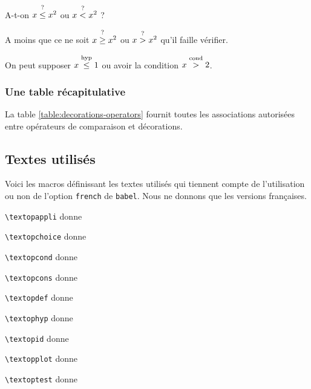\documentclass[12pt,a4paper]{article}
\begin{document}
\begin{tcblisting}{}
A-t-on $x \leqtest x^2$ ou $x \ltest x^2$ ?

A moins que ce ne soit $x \geqtest x^2$ ou $x \gtest x^2$ qu'il faille vérifier.

On peut supposer $x \leqhyp 1$ ou avoir la condition $x \gcond 2$.

\end{tcblisting}



\subsubsection{Une table récapitulative}

La table \ref{table:decorations-operators}  fournit toutes les associations autorisées entre opérateurs de comparaison et décorations.



\subsection{Textes utilisés} \label{text-for-opes}

Voici les macros définissant les textes utilisés qui tiennent compte de l'utilisation ou non de l'option \verb+french+ de \verb+babel+. Nous ne donnons que les versions françaises.


\begin{multicols}{2}
    \verb+\textopappli+ donne \emph{\og \textopappli \fg}

    \verb+\textopchoice+ donne \emph{\og \textopchoice \fg}

    \verb+\textopcond+ donne \emph{\og \textopcond \fg}

    \verb+\textopcons+ donne \emph{\og \textopcons \fg}

    \verb+\textopdef+ donne \emph{\og \textopdef \fg}

    \verb+\textophyp+ donne \emph{\og \textophyp \fg}

    \verb+\textopid+ donne \emph{\og \textopid \fg}

    \verb+\textopplot+ donne \emph{\og \textopplot \fg}

    \verb+\textoptest+ donne \emph{\og \textoptest \fg}
\vfill\null\end{multicols}

\end{document}
